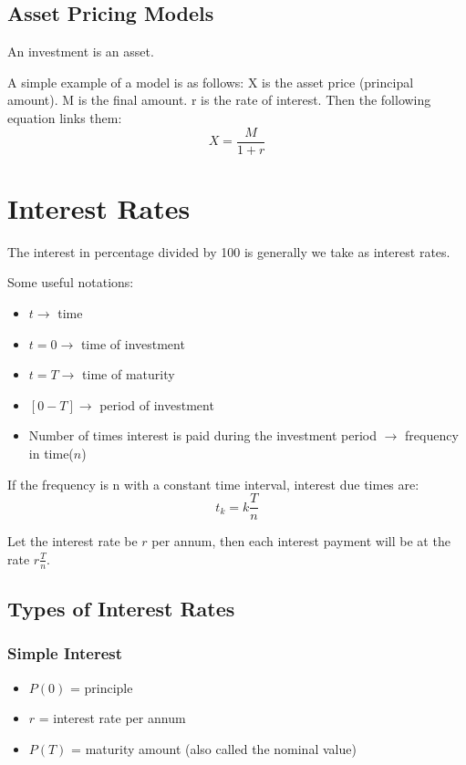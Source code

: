 \documentclass{report}
\begin{document}
\subsection{Asset Pricing Models}
An investment is an asset.


A simple example of a model is as follows: X is the asset price (principal amount). M is the final amount. r is the rate of interest. Then the following equation links them:
\begin{equation}
    X = \frac{M}{1+r}
\end{equation}


\section{Interest Rates}
The interest in percentage divided by 100 is generally we take as interest rates.

Some useful notations:
\begin{itemize}
    \item $t\longrightarrow$ time
    \item $t = 0 \longrightarrow $ time of investment
    \item $t = T \longrightarrow $ time of maturity
    \item $[0-T] \longrightarrow $ period of investment
    \item Number of times interest is paid during the investment period $\longrightarrow$ frequency in time($n$)
\end{itemize}

If the frequency is n with a constant time interval, interest due times are:
\begin{equation}
    t_k = k\frac{T}{n}
\end{equation}

Let the interest rate be $r$ per annum, then each interest payment will be at the rate $r\frac{T}{n}$.


\subsection{Types of Interest Rates}
\subsubsection{Simple Interest}
\begin{itemize}
    \item $P(0)$ = principle
    \item $r$ = interest rate per annum
    \item $P(T)$ = maturity amount (also called the nominal value)
\end{itemize}
\end{document}
